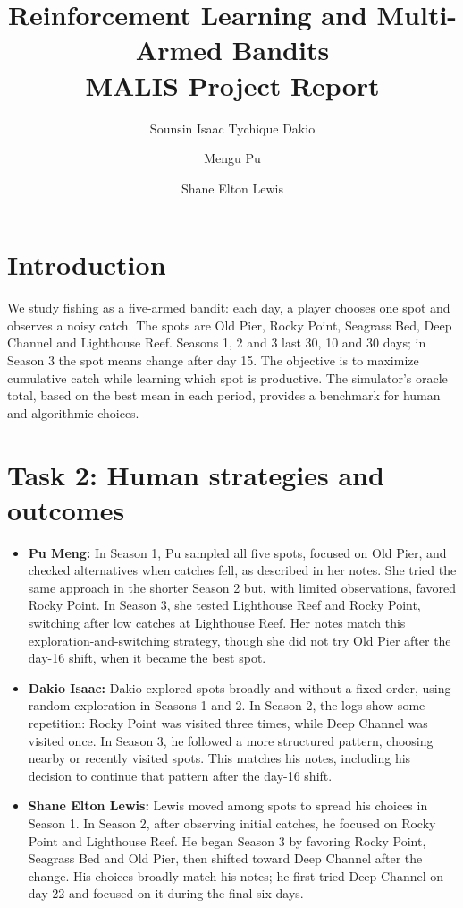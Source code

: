\documentclass[11pt,a4paper]{article}
\title{Reinforcement Learning and Multi-Armed Bandits\\\large MALIS Project Report}
\author{Sounsin Isaac Tychique Dakio \and Mengu Pu \and Shane Elton Lewis}
\date{}
\begin{document}
\maketitle

\section{Introduction}
We study fishing as a five-armed bandit: each day, a player chooses one spot and observes a noisy catch. The spots are Old Pier, Rocky Point, Seagrass Bed, Deep Channel and Lighthouse Reef. Seasons 1, 2 and 3 last 30, 10 and 30 days; in Season 3 the spot means change after day 15. The objective is to maximize cumulative catch while learning which spot is productive. The simulator's oracle total, based on the best mean in each period, provides a benchmark for human and algorithmic choices.

\section{Task 2: Human strategies and outcomes}
\begin{itemize}
    \item \textbf{Pu Meng:} In Season 1, Pu sampled all five spots, focused on Old Pier, and checked alternatives when catches fell, as described in her notes. She tried the same approach in the shorter Season 2 but, with limited observations, favored Rocky Point. In Season 3, she tested Lighthouse Reef and Rocky Point, switching after low catches at Lighthouse Reef. Her notes match this exploration-and-switching strategy, though she did not try Old Pier after the day-16 shift, when it became the best spot.

    \item \textbf{Dakio Isaac:} Dakio explored spots broadly and without a fixed order, using random exploration in Seasons 1 and 2. In Season 2, the logs show some repetition: Rocky Point was visited three times, while Deep Channel was visited once. In Season 3, he followed a more structured pattern, choosing nearby or recently visited spots. This matches his notes, including his decision to continue that pattern after the day-16 shift.

    \item \textbf{Shane Elton Lewis:} Lewis moved among spots to spread his choices in Season 1. In Season 2, after observing initial catches, he focused on Rocky Point and Lighthouse Reef. He began Season 3 by favoring Rocky Point, Seagrass Bed and Old Pier, then shifted toward Deep Channel after the change. His choices broadly match his notes; he first tried Deep Channel on day 22 and focused on it during the final six days.
\end{itemize}
\end{document}
